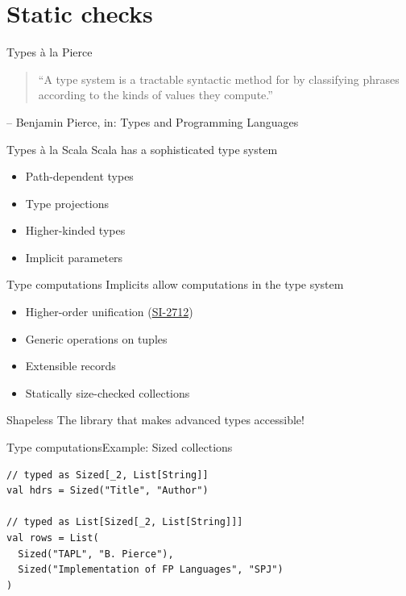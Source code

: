 \documentclass{beamer}
\begin{document}
  \section{Static checks}

\begin{frame}{Types \`a la Pierce}
  \begin{quote}
    ``A type system is a tractable syntactic method for  by classifying phrases according to the kinds of values they compute.''
  \end{quote}
  \hfill -- Benjamin Pierce, in: Types and Programming Languages
\end{frame}

\begin{frame}{Types \`a la Scala}
  Scala has a sophisticated type system
  \begin{itemize}
    \item Path-dependent types
    \item Type projections
    \item Higher-kinded types
    \item Implicit parameters
  \end{itemize}
\end{frame}

\begin{frame}{Type computations}
  Implicits allow computations in the type system

  \begin{itemize}
    \item Higher-order unification (\href{https://issues.scala-lang.org/browse/SI-2712}{SI-2712})
    \item Generic operations on tuples
    \item Extensible records
    \item Statically size-checked collections
  \end{itemize}
\end{frame}

\begin{frame}{Shapeless}
  The library that makes advanced types accessible!
\end{frame}

\begin{frame}[fragile]{Type computations}{Example: Sized collections}
  \begin{verbatim}
// typed as Sized[_2, List[String]]
val hdrs = Sized("Title", "Author")

// typed as List[Sized[_2, List[String]]]
val rows = List(
  Sized("TAPL", "B. Pierce"),
  Sized("Implementation of FP Languages", "SPJ")
)
  \end{verbatim}

\end{frame}
\end{document}
